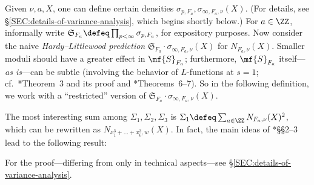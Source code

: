 \documentclass[12pt]{report}
\begin{document}
Given $\nu,a,X$,
one can define certain densities $\sigma_{p,F_a},\sigma_{\infty,F_a,\nu}(X)$.
(For details,
see \S\ref{SEC:details-of-variance-analysis},
which begins shortly below.)
For $a\in\ZZ$,
informally write $\mathfrak{S}_{F_a}
\defeq\prod_{p<\infty}\sigma_{p,F_a}$,
for expository purposes.
Now consider the naive \emph{Hardy--Littlewood prediction} $\mathfrak{S}_{F_a}\cdot\sigma_{\infty,F_a,\nu}(X)$ for $N_{F_a,\nu}(X)$.
Smaller moduli should have a greater effect in $\mf{S}_{F_a}$;
furthermore,
$\mf{S}_{F_a}$ itself---\emph{as is}---can be subtle (involving the behavior of $L$-functions at $s=1$; cf.~\cite{duke1990representation}*{Theorem~3 and its proof} and \cite{heath1996new}*{Theorems~6--7}).
So in the following definition,
we work with a ``restricted'' version of $\mathfrak{S}_{F_a}\cdot\sigma_{\infty,F_a,\nu}(X)$.

The most interesting sum among $\Sigma_1,\Sigma_2,\Sigma_3$ is
$\Sigma_1\defeq\sum_{a\in\ZZ}N_{F_a,\nu}(X)^2$, which can be rewritten as $N_{x_1^3+\dots+x_6^3,w}(X)$.
In fact, the main ideas of \cite{diaconu2019admissible}*{\S\S2--3} lead to the following result:

For the proof---differing from \cite{diaconu2019admissible} only in technical aspects---see \S\ref{SEC:details-of-variance-analysis}.
\end{document}
